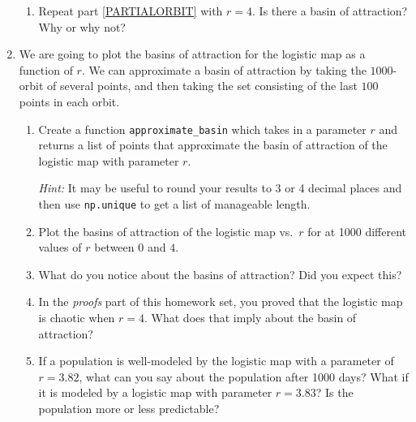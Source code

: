 \documentclass[letter]{article}
\begin{document}
\begin{enumerate}
\begin{enumerate}
			\item Repeat part \ref{PARTIALORBIT} with $r=4$. Is there a basin of attraction? Why or why not?
		\end{enumerate}

		\item We are going to plot the basins of attraction for the logistic map as a function of $r$. We can approximate a basin
			of attraction by taking the $1000$-orbit of several points, and then taking the set consisting of the last $100$ points
			in each orbit.

		\begin{enumerate}
			\item Create a function \verb|approximate_basin| which takes in a parameter $r$ and returns a list
				of points that approximate the basin of attraction of the logistic map with parameter $r$.

				\emph{Hint:} It may be useful to round your results to 3 or 4 decimal places and then use {\tt np.unique}
				to get a list of manageable length.
			\item Plot the basins of attraction of the logistic map vs.~$r$ for at 1000 different values of $r$ between $0$
				and $4$.
			\item What do you notice about the basins of attraction? Did you expect this?
			\item In the \emph{proofs} part of this homework set, you proved that the logistic map is chaotic when $r=4$.
				What does that imply about the basin of attraction?

			\item If a population is well-modeled by the logistic map with a parameter of $r=3.82$, what can you say about the population
				after 1000 days? What if it is modeled by a logistic map with parameter $r=3.83$? Is the population more or less
				predictable?
		\end{enumerate}

	\end{enumerate}
\end{document}
